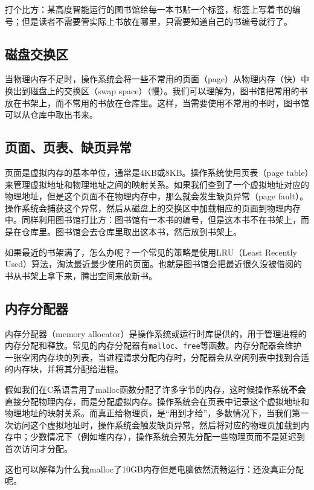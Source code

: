 \documentclass[../main.tex]{subfiles}
\begin{document}
打个比方：某高度智能运行的图书馆给每一本书贴一个标签，标签上写着书的编号；但是读者不需要管实际上书放在哪里，只需要知道自己的书编号就行了。

\subsection{磁盘交换区}

当物理内存不足时，操作系统会将一些不常用的页面（page）从物理内存（快）中换出到磁盘上的交换区（swap space）（慢）。我们可以理解为，图书馆把常用的书放在书架上，而不常用的书放在仓库里。这样，当需要使用不常用的书时，图书馆可以从仓库中取出书来。

\subsection{页面、页表、缺页异常}

页面是虚拟内存的基本单位，通常是4KB或8KB。操作系统使用页表（page table）来管理虚拟地址和物理地址之间的映射关系。如果我们查到了一个虚拟地址对应的物理地址，但是这个页面不在物理内存中，那么就会发生缺页异常（page fault）。操作系统会捕获这个异常，然后从磁盘上的交换区中加载相应的页面到物理内存中。同样利用图书馆打比方：图书馆有一本书的编号，但是这本书不在书架上，而是在仓库里。图书馆会去仓库里取出这本书，然后放到书架上。

如果最近的书架满了，怎么办呢？一个常见的策略是使用LRU（Least Recently Used）算法，淘汰最近最少使用的页面。也就是图书馆会把最近很久没被借阅的书从书架上拿下来，腾出空间来放新书。

\subsection{内存分配器}

内存分配器（memory allocator）是操作系统或运行时库提供的，用于管理进程的内存分配和释放。常见的内存分配器有\texttt{malloc}、\texttt{free}等函数。内存分配器会维护一张空闲内存块的列表，当进程请求分配内存时，分配器会从空闲列表中找到合适的内存块，并将其分配给进程。

假如我们在C系语言用了malloc函数分配了许多字节的内存，这时候操作系统\textbf{不会}直接分配物理内存，而是分配虚拟内存。操作系统会在页表中记录这个虚拟地址和物理地址的映射关系。而真正给物理页，是“用到才给”，多数情况下，当我们第一次访问这个虚拟地址时，操作系统会触发缺页异常，然后将对应的物理页加载到内存中；少数情况下（例如堆内存），操作系统会预先分配一些物理页而不是延迟到首次访问才分配。

这也可以解释为什么我malloc了10GB内存但是电脑依然流畅运行：还没真正分配呢。
\end{document}
